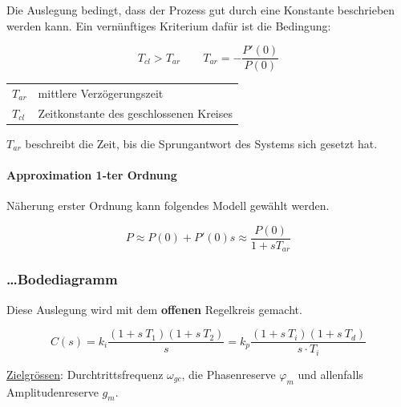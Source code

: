 \documentclass[
  10pt,
  a4paper,
  twocolumn]{article}
\makeatletter
\let\oldparagraph\paragraph
\renewcommand{\paragraph}[1]{\oldparagraph{#1}\mbox{}}
\numberwithin{equation}{section}
\newenvironment{conditions}
  {\par\vspace{\abovedisplayskip}\noindent\begin{tabular}{>{$}l<{$} @{${}:{}$} l}}
  {\end{tabular}\par\vspace{\belowdisplayskip}}
\let\paragraph\oldparagraph
\renewcommand{\paragraph}[1]{\oldparagraph{#1}\mbox{}\par}
\makeatother
\begin{document}
\begin{tcolorbox}[enhanced jigsaw, bottomtitle=1mm, title=\textcolor{quarto-callout-caution-color}{\faFire}\hspace{0.5em}{mittlere Verzögerungszeit}, arc=.35mm, rightrule=.15mm, toprule=.15mm, opacitybacktitle=0.6, coltitle=black, bottomrule=.15mm, toptitle=1mm, colframe=quarto-callout-caution-color-frame, colbacktitle=quarto-callout-caution-color!10!white, breakable, titlerule=0mm, leftrule=.75mm, left=2mm, opacityback=0, colback=white]

Die Auslegung bedingt, dass der Prozess gut durch eine Konstante
beschrieben werden kann. Ein vernünftiges Kriterium dafür ist die
Bedingung:

\[
T_{cl}>T_{ar}\qquad T_{ar}=-\frac{P'(0)}{P(0)}
\]

\begin{conditions}
  T_{ar} & mittlere Verzögerungszeit \\
  T_{cl} & Zeitkonstante des geschlossenen Kreises
\end{conditions}

\(T_{ar}\) beschreibt die Zeit, bis die Sprungantwort des Systems sich
gesetzt hat.

\end{tcolorbox}

\hypertarget{approximation-1-ter-ordnung}{%
\paragraph{Approximation 1-ter
Ordnung}\label{approximation-1-ter-ordnung}}

Näherung erster Ordnung kann folgendes Modell gewählt werden.

\[
P\approx P(0)+P'(0)s\approx \frac{P(0)}{1+sT_{ar}}
\]

\hypertarget{bodediagramm}{%
\subsubsection{\ldots Bodediagramm}\label{bodediagramm}}

Diese Auslegung wird mit dem \textbf{offenen} Regelkreis gemacht.

\[
C(s) = k_i \frac{(1+s\ T_1)(1+s\ T_2)}{s} = k_p \frac{(1+s\ T_i)(1+s\ T_d)}{s\cdot T_i}
\]

\ul{Zielgrössen}: Durchtrittsfrequenz \(\omega_{gc}\), die Phasenreserve
\(\varphi_m\) und allenfalls Amplitudenreserve \(g_m\).

\newpage
\end{document}
